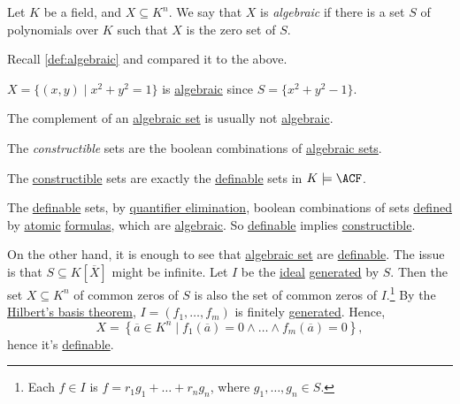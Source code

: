 \begin{definition}[Algebraic]\label{def:algebraic-set}
	Let \(K\) be a field, and \(X \subseteq K^n\). We say that \(X\) is \emph{algebraic} if there is a set \(S\) of polynomials over \(K\) such that \(X\) is the zero set of \(S\).
\end{definition}

\begin{prev}
	Recall \autoref{def:algebraic} and compared it to the above.
\end{prev}

\begin{eg}
	\(X = \{(x, y) \mid x^2 + y^2 = 1\}\) is \hyperref[def:algebraic]{algebraic} since \(S = \{ x^2 + y^2 -1 \} \).
\end{eg}

The complement of an \hyperref[def:algebraic-set]{algebraic set} is usually not \hyperref[def:algebraic-set]{algebraic}.

\begin{definition}[Constructible]\label{def:constructible}
	The \emph{constructible} sets are the boolean combinations of \hyperref[def:algebraic-set]{algebraic sets}.
\end{definition}

\begin{remark}
	The \hyperref[def:constructible]{constructible} sets are exactly the \hyperref[def:definable]{definable} sets in \(K \models \ACF\).
\end{remark}
\begin{explanation}
	The \hyperref[def:definable]{definable} sets, by \hyperref[def:quantifier-elimination]{quantifier elimination}, boolean combinations of sets \hyperref[def:definable]{defined} by \hyperref[not:atomic]{atomic} \hyperref[def:formula]{formulas}, which are \hyperref[def:algebraic-set]{algebraic}. So \hyperref[def:definable]{definable} implies \hyperref[def:constructible]{constructible}.

	On the other hand, it is enough to see that \hyperref[def:algebraic-set]{algebraic set} are \hyperref[def:definable]{definable}. The issue is that \(S \subseteq K[\overline{X} ]\) might be infinite. Let \(I\) be the \hyperref[def:ideal]{ideal} \hyperref[def:ideal-generation]{generated} by \(S\). Then the set \(X \subseteq K^n\) of common zeros of \(S\) is also the set of common zeros of \(I\).\footnote{Each \(f\in I\) is \(f = r_1 g_1 + \ldots + r_n g_n\), where \(g_1, \ldots , g_n \in S\).} By the \hyperref[thm:Hilbert-basis]{Hilbert's basis theorem}, \(I = (f_1, \ldots , f_m)\) is finitely \hyperref[def:ideal-generation]{generated}. Hence,
	\[
		X = \left\{ \overline{a} \in K^n \mid f_1(\overline{a} ) = 0 \land \ldots \land f_{m}(\overline{a} ) = 0  \right\},
	\]
	hence it's \hyperref[def:definable]{definable}.
\end{explanation}

